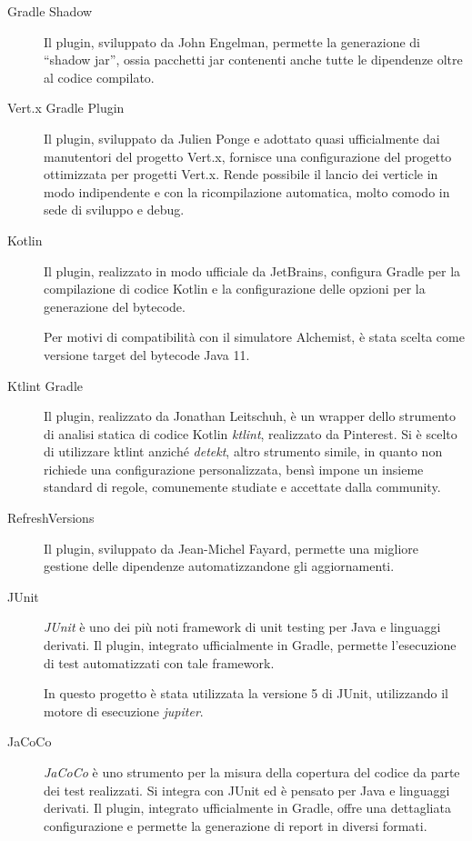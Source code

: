       \begin{description}
        \item[Gradle Shadow]
          Il plugin, sviluppato da John Engelman, permette la generazione di ``shadow jar'', ossia pacchetti jar contenenti anche tutte le dipendenze oltre al codice compilato.

        \item[Vert.x Gradle Plugin]
          Il plugin, sviluppato da Julien Ponge e adottato quasi ufficialmente dai manutentori del progetto Vert.x, fornisce una configurazione del progetto ottimizzata per progetti Vert.x.
          Rende possibile il lancio dei verticle in modo indipendente e con la ricompilazione automatica, molto comodo in sede di sviluppo e debug.

        \item[Kotlin]
          Il plugin, realizzato in modo ufficiale da JetBrains, configura Gradle per la compilazione di codice Kotlin e la configurazione delle opzioni per la generazione del bytecode.

          Per motivi di compatibilità con il simulatore Alchemist, è stata scelta come versione target del bytecode Java 11.

        \item[Ktlint Gradle]
          Il plugin, realizzato da Jonathan Leitschuh, è un wrapper dello strumento di analisi statica di codice Kotlin \emph{ktlint}, realizzato da Pinterest.
          Si è scelto di utilizzare ktlint anziché \emph{detekt}, altro strumento simile, in quanto non richiede una configurazione personalizzata, bensì impone un insieme standard di regole, comunemente studiate e accettate dalla community.

        \item[RefreshVersions]
          Il plugin, sviluppato da Jean-Michel Fayard, permette una migliore gestione delle dipendenze automatizzandone gli aggiornamenti.

        \item[JUnit]
          \emph{JUnit} è uno dei più noti framework di unit testing per Java e linguaggi derivati.
          Il plugin, integrato ufficialmente in Gradle, permette l'esecuzione di test automatizzati con tale framework.

          In questo progetto è stata utilizzata la versione 5 di JUnit, utilizzando il motore di esecuzione \emph{jupiter}.
        \item[JaCoCo]
          \emph{JaCoCo} è uno strumento per la misura della copertura del codice da parte dei test realizzati.
          Si integra con JUnit ed è pensato per Java e linguaggi derivati.
          Il plugin, integrato ufficialmente in Gradle, offre una dettagliata configurazione e permette la generazione di report in diversi formati.
      \end{description}

